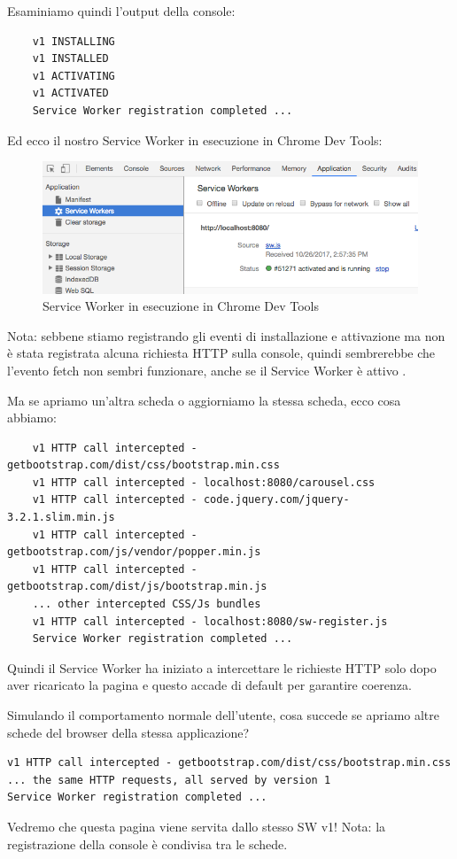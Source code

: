 \documentclass[italian]{article}
\begin{document}
Esaminiamo quindi l'output della console:
\begin{lstlisting}
	v1 INSTALLING 
	v1 INSTALLED
	v1 ACTIVATING
	v1 ACTIVATED
	Service Worker registration completed ...
\end{lstlisting}
Ed ecco il nostro Service Worker in esecuzione in Chrome Dev Tools:
\begin{figure}
	\centering
	\includegraphics[width=1\linewidth]{DevTools}
	\caption{Service Worker in esecuzione in Chrome Dev Tools}
	\label{fig:Service Worker in esecuzione in Chrome Dev Tools}
\end{figure}
Nota: sebbene stiamo registrando gli eventi di installazione e attivazione ma non è stata registrata alcuna richiesta HTTP sulla console, quindi sembrerebbe che l'evento fetch non sembri funzionare, anche se il Service Worker è attivo .

Ma se apriamo un'altra scheda o aggiorniamo la stessa scheda, ecco cosa abbiamo:
\begin{lstlisting}
	v1 HTTP call intercepted - getbootstrap.com/dist/css/bootstrap.min.css
	v1 HTTP call intercepted - localhost:8080/carousel.css
	v1 HTTP call intercepted - code.jquery.com/jquery-3.2.1.slim.min.js
	v1 HTTP call intercepted - getbootstrap.com/js/vendor/popper.min.js
	v1 HTTP call intercepted - getbootstrap.com/dist/js/bootstrap.min.js
	... other intercepted CSS/Js bundles
	v1 HTTP call intercepted - localhost:8080/sw-register.js
	Service Worker registration completed ...
\end{lstlisting}
Quindi il Service Worker ha iniziato a intercettare le richieste HTTP solo dopo aver ricaricato la pagina e questo accade di default per garantire coerenza.


Simulando il comportamento normale dell'utente, cosa succede se apriamo altre schede del browser della stessa applicazione?
\begin{lstlisting}
v1 HTTP call intercepted - getbootstrap.com/dist/css/bootstrap.min.css
... the same HTTP requests, all served by version 1
Service Worker registration completed ...
\end{lstlisting}
Vedremo che questa pagina viene servita dallo stesso SW v1! 
Nota: la registrazione della console è condivisa tra le schede.
\end{document}

